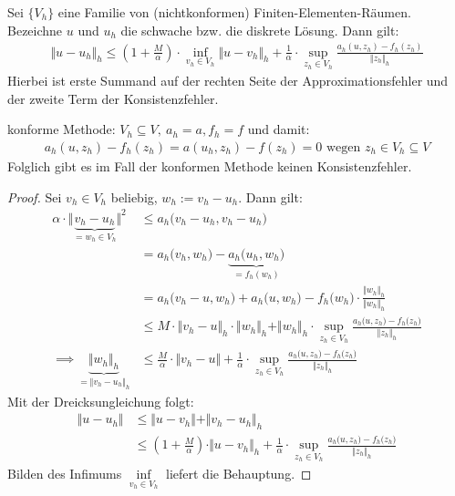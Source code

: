 \begin{theorem}\label{theorem5.1ZweitesLemmaStrang}\enter
Sei $\lbrace V_h\rbrace$ eine Familie von (nichtkonformen) Finiten-Elementen-Räumen. Bezeichne $u$ und $u_h$ die schwache bzw. die diskrete Lösung. Dann gilt:
\begin{align*}
\big\Vert u-u_h\big\Vert_h\leq\left(1+\frac{M}{\alpha}\right)\cdot\inf\limits_{v_h\in V_h}\big\Vert u-v_h\big\Vert_h
+\frac{1}{\alpha}\cdot\sup\limits_{z_h\in V_h}\frac{a_h(u,z_h)-f_h(z_h)}{\Vert z_h\Vert_h}
\end{align*}
Hierbei ist erste Summand auf der rechten Seite der Approximationsfehler und der zweite Term der Konsistenzfehler.
\end{theorem}

\begin{bemerkung}
konforme Methode: $V_h\subseteq V,~a_h=a,f_h=f$ und damit:
\begin{align*}
a_h(u,z_h)-f_h(z_h)=a(u_h,z_h)-f(z_h)=0\text{ wegen } z_h\in V_h\subseteq V
\end{align*}
Folglich gibt es im Fall der konformen Methode keinen Konsistenzfehler.
\end{bemerkung}

\begin{proof}
Sei $v_h\in V_h$ beliebig, $w_h:=v_h-u_h$. Dann gilt:
\begin{align*}
\alpha\cdot\big\Vert\underbrace{v_h-u_h}_{=w_h\in V_h}\big\Vert^2
&\leq a_h\big(v_h-u_h,v_h-u_h\big)\\
&=a_h\big(v_h,w_h\big)-\underbrace{a_h\big(u_h,w_h\big)}_{=f_h(w_h)}\\
&=a_h\big(v_h-u,w_h\big)+a_h\big(u,w_h\big)-f_h\big(w_h\big)\cdot\frac{\Vert w_h\Vert_h}{\Vert w_h\Vert_h}\\
&\leq M\cdot\big\Vert v_h-u\big\Vert_h\cdot\big\Vert w_h\big\Vert_h+\Vert w_h\Vert_h\cdot\sup\limits_{z_h\in V_h}\frac{a_h\big(u,z_h\big)-f_h\big(z_h\big)}{\Vert z_h\Vert_h}\\
\implies
\underbrace{\Vert w_h\Vert_h}_{=\Vert v_h-u_h\Vert_h}&\leq\frac{M}{\alpha}\cdot\big\Vert v_h-u\big\Vert+\frac{1}{\alpha}\cdot\sup\limits_{z_h\in V_h}\frac{a_h\big(u,z_h\big)-f_h\big(z_h\big)}{\Vert z_h\Vert_h}
\end{align*}
Mit der Dreicksungleichung folgt:
\begin{align*}
\Vert u-u_h\Vert
&\leq\Vert u-v_h\Vert+\Vert v_h-u_h\Vert_h\\
&\leq\left(1+\frac{M}{\alpha}\right)\cdot\Vert u-v_h\Vert_h+\frac{1}{\alpha}\cdot\sup\limits_{z_h\in V_h}\frac{a_h\big(u,z_h\big)-f_h\big(z_h\big)}{\Vert z_h\Vert_h}
\end{align*}
Bilden des Infimums $\inf\limits_{v_h\in V_h}$ liefert die Behauptung.
\end{proof}

